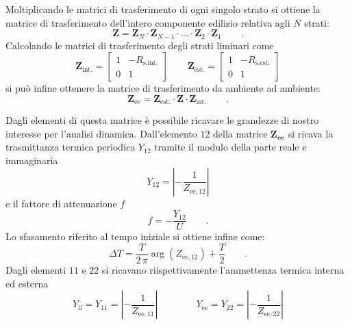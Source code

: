 Moltiplicando le matrici di trasferimento di ogni singolo strato si ottiene la matrice di trasferimento dell'intero componente edilizio relativa agli $N$  strati:
\begin{equation}
    \mathbf{Z}=\mathbf{Z}_{N}\cdot\mathbf{Z}_{N-1}\cdot\ldots\cdot\mathbf{Z}_{2}\cdot\mathbf{Z}_{1} \qquad .
\end{equation}
Calcolando le matrici di trasferimento degli strati liminari come
\begin{equation}
    \mathbf{Z}_{\text{int.}} = 
    \begin{bmatrix}
        1 & -R_{\text{s,int.}} \\
        0 & 1
    \end{bmatrix}
    \qquad
    \mathbf{Z}_{\text{est.}} = 
    \begin{bmatrix}
        1 & -R_{\text{s,est.}} \\
        0 & 1
    \end{bmatrix}
\end{equation}
si può infine ottenere la matrice di trasferimento da ambiente ad ambiente:
\begin{equation}
    \mathbf{Z}_{\text{ee}} = \mathbf{Z}_{\text{est.}} \cdot \mathbf{Z} \cdot \mathbf{Z}_{\text{int.}} \qquad .
\end{equation}

Dagli elementi di questa matrice è possibile ricavare le grandezze di nostro interesse per l'analisi dinamica.
Dall'elemento {\footnotesize $12$} della matrice $\mathbf{Z_{\text{ee}}}$ si ricava la trasmittanza termica periodica $Y_{12}$ tramite il modulo della parte reale e immaginaria
\begin{equation}
    Y_{12} = \left\lvert -\frac{1}{Z_{\text{ee},12}}\right\rvert 
\end{equation} 
e il fattore di attenuazione $f$
\begin{equation}
    f = -\frac{Y_{12}}{U} \qquad .
\end{equation}
Lo sfasamento riferito al tempo iniziale si ottiene infine come:
\begin{equation}
    \Delta T = \frac{T}{2\,\pi}\arg\left(Z_{\text{ee},12}\right) + \frac{T}{2} \qquad .
\end{equation}
Dagli elementi {\footnotesize $11$} e {\footnotesize $22$} si ricavano riispettivamente l'ammettenza termica interna ed esterna 
\begin{equation}
    Y_{\text{ii}}=Y_{11} = \left\lvert -\frac{1}{Z_{\text{ee},11}}\right\rvert \qquad \qquad
    Y_{\text{ee}}=Y_{22} = \left\lvert -\frac{1}{Z_{\text{ee},22}}\right\rvert 
\end{equation} 
